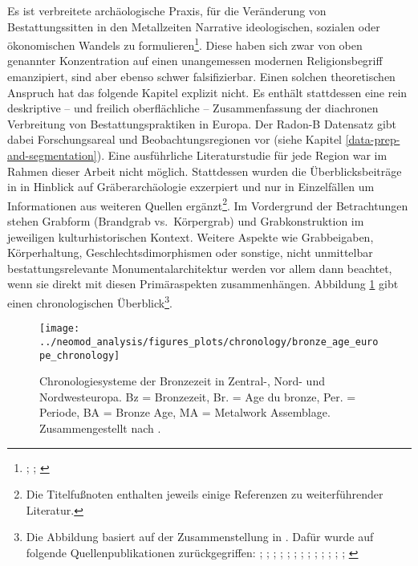 \documentclass[openany,twoside,twocolumn]{book}
\let\rmarkdownfootnote\footnote%
\def\footnote{\protect\rmarkdownfootnote}
\begin{document}
Es ist verbreitete archäologische Praxis, für die Veränderung von Bestattungssitten in den Metallzeiten Narrative ideologischen, sozialen oder ökonomischen Wandels zu formulieren\footnote{\textcite{barrett_monumentality_1990}; \textcite{fokkens_genesis_1997-1}; \textcite{muller-scheesel_variabilitat_2009}}. Diese haben sich zwar von oben genannter Konzentration auf einen unangemessen modernen Religionsbegriff emanzipiert, sind aber ebenso schwer falsifizierbar. Einen solchen theoretischen Anspruch hat das folgende Kapitel explizit nicht. Es enthält stattdessen eine rein deskriptive -- und freilich oberflächliche -- Zusammenfassung der diachronen Verbreitung von Bestattungspraktiken in Europa. Der Radon-B Datensatz gibt dabei Forschungsareal und Beobachtungsregionen vor (siehe Kapitel \ref{data-prep-and-segmentation}). Eine ausführliche Literaturstudie für jede Region war im Rahmen dieser Arbeit nicht möglich. Stattdessen wurden die Überblicksbeiträge in \textcite{fokkens_oxford_2013} in Hinblick auf Gräberarchäologie exzerpiert und nur in Einzelfällen um Informationen aus weiteren Quellen ergänzt\footnote{Die Titelfußnoten enthalten jeweils einige Referenzen zu weiterführender Literatur.}. Im Vordergrund der Betrachtungen stehen Grabform (Brandgrab vs.~Körpergrab) und Grabkonstruktion im jeweiligen kulturhistorischen Kontext. Weitere Aspekte wie Grabbeigaben, Körperhaltung, Geschlechtsdimorphismen oder sonstige, nicht unmittelbar bestattungsrelevante Monumentalarchitektur werden vor allem dann beachtet, wenn sie direkt mit diesen Primäraspekten zusammenhängen. Abbildung \ref{fig:general-chronology} gibt einen chronologischen Überblick\footnote{Die Abbildung basiert auf der Zusammenstellung in \textcite{roberts_old_2013}. Dafür wurde auf folgende Quellenpublikationen zurückgegriffen: \textcite{arnoldussen_bronze_2008}; \textcite{bourgeois_lage_2005}; \textcite{burgess_bronze_1974}; \textcite{burgess_age_1980}; \textcite{brindley_dating_2007}; \textcite{eogan_accomplished_1994}; \textcite{gerloff_reineckes_2007}; \textcite{gerloff_atlantic_2010}; \textcite{de_laet_belgique_1982}; \textcite{lanting_14c-chronologie_2001}; \textcite{louwe_kooijmanns_prehistory_2005}; \textcite{needham_chronology_1996}; \textcite{needham_independent_1997}; \textcite{needham_first_2010}}.

\begin{landscape}
\begin{figure}[!t]

{\centering \texttt{[image: ../neomod\_analysis/figures\_plots/chronology/bronze\_age\_europe\_chronology]} 

}

\caption[Chronologiesysteme der Bronzezeit in Zentral-, Nord- und Nordwesteuropa]{Chronologiesysteme der Bronzezeit in Zentral-, Nord- und Nordwesteuropa. Bz = Bronzezeit, Br. = Age du bronze, Per. = Periode, BA = Bronze Age, MA = Metalwork Assemblage. Zusammengestellt nach \textcite{roberts_old_2013}.}\label{fig:general-chronology}
\end{figure}
\end{landscape}
\end{document}
